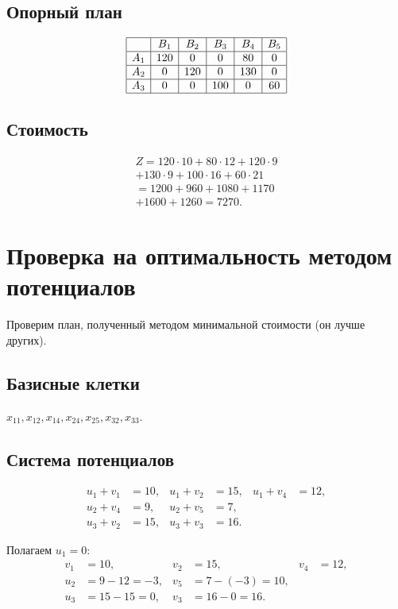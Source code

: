 \documentclass{article}
\begin{document}
\subsection{Опорный план}
\[
\begin{array}{|c|c|c|c|c|c|}
\hline
 & B_1 & B_2 & B_3 & B_4 & B_5 \\
\hline
A_1 & 120 & 0 & 0 & 80 & 0 \\
\hline
A_2 & 0 & 120 & 0 & 130 & 0 \\
\hline
A_3 & 0 & 0 & 100 & 0 & 60 \\
\hline
\end{array}
\]

\subsection{Стоимость}
\begin{multline}
Z = 120 \cdot 10 + 80 \cdot 12 + 120 \cdot 9 \\
+ 130 \cdot 9 + 100 \cdot 16 + 60 \cdot 21 \\
= 1200 + 960 + 1080 + 1170 \\
+ 1600 + 1260 = 7270.
\end{multline}

\section{Проверка на оптимальность методом потенциалов}

Проверим план, полученный методом минимальной стоимости (он лучше других).

\subsection{Базисные клетки}
\( x_{11}, x_{12}, x_{14}, x_{24}, x_{25}, x_{32}, x_{33} \).

\subsection{Система потенциалов}
\[
\begin{aligned}
u_1 + v_1 &= 10, & u_1 + v_2 &= 15, & u_1 + v_4 &= 12, \\
u_2 + v_4 &= 9, & u_2 + v_5 &= 7, \\
u_3 + v_2 &= 15, & u_3 + v_3 &= 16.
\end{aligned}
\]

Полагаем \( u_1 = 0 \):
\[
\begin{aligned}
v_1 &= 10, & v_2 &= 15, & v_4 &= 12, \\
u_2 &= 9 - 12 = -3, & v_5 &= 7 - (-3) = 10, \\
u_3 &= 15 - 15 = 0, & v_3 &= 16 - 0 = 16.
\end{aligned}
\]
\end{document}

